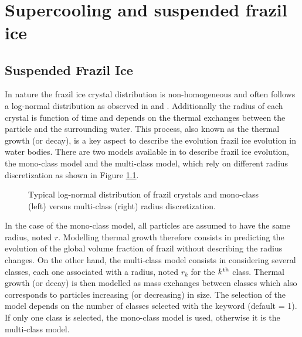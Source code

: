  \renewcommand{\labelitemi}{$\rhd$}

~\newline
\chapter{Supercooling and suspended frazil ice}
\label{chapter:tracers}

\section{Suspended Frazil Ice}

In nature the frazil ice crystal distribution is non-homogeneous and often follows a log-normal distribution
as observed in \cite{clark_2006} and \cite{macfarlane_2017}. Additionally the radius of each crystal is function of time
and depends on the thermal exchanges between the particle and the surrounding water.
This process, also known as the thermal growth (or decay), is a key aspect to describe the evolution frazil ice
evolution in water bodies.
There are two models available in \khione to describe frazil ice evolution, the mono-class model
and the multi-class model, which rely on different radius discretization as shown in Figure \ref{fig:radius_discretization}.

\begin{figure}[H]
    \begin{center}
    \end{center}
    \caption{Typical log-normal distribution of frazil crystals and mono-class (left) versus multi-class (right) radius discretization.}
    \label{fig:radius_discretization}
\end{figure}

In the case of the mono-class model, all particles are assumed to have the same radius, noted $r$.
Modelling thermal growth therefore consists in predicting the evolution of the global volume fraction of frazil without
describing the radius changes.
On the other hand, the multi-class model consists in considering several classes, each one associated with a radius, noted $r_k$ for the $k^{\rm{th}}$ class.
Thermal growth (or decay) is then modelled as mass exchanges between classes which also corresponds to particles increasing (or decreasing) in size.
The selection of the model depends on the number of classes selected with the keyword
 (default = 1). If only one class is selected, the mono-class model is used,
otherwise it is the multi-class model.

